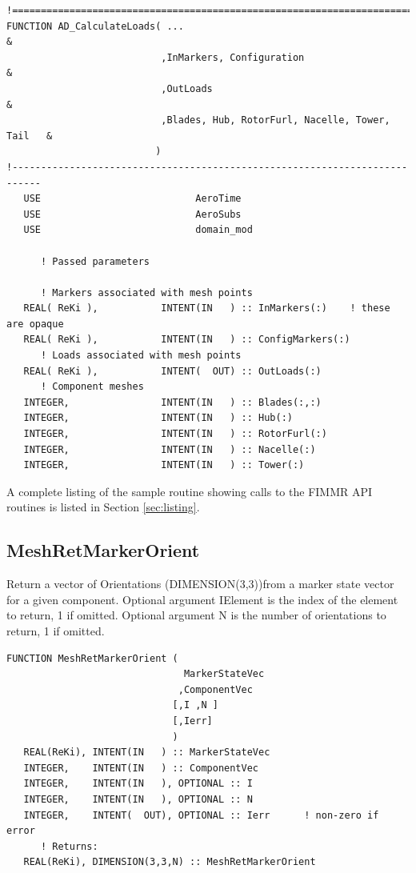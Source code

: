 \documentclass[11pt]{article}
\begin{document}
\begin{verbatim}
!===========================================================================
FUNCTION AD_CalculateLoads( ...                                            &
                           ,InMarkers, Configuration                       &
                           ,OutLoads                                       &
                           ,Blades, Hub, RotorFurl, Nacelle, Tower, Tail   &
                          )
!---------------------------------------------------------------------------
   USE                           AeroTime
   USE                           AeroSubs
   USE                           domain_mod

      ! Passed parameters

      ! Markers associated with mesh points
   REAL( ReKi ),           INTENT(IN   ) :: InMarkers(:)    ! these are opaque
   REAL( ReKi ),           INTENT(IN   ) :: ConfigMarkers(:)
      ! Loads associated with mesh points
   REAL( ReKi ),           INTENT(  OUT) :: OutLoads(:)
      ! Component meshes
   INTEGER,                INTENT(IN   ) :: Blades(:,:)     
   INTEGER,                INTENT(IN   ) :: Hub(:)
   INTEGER,                INTENT(IN   ) :: RotorFurl(:)
   INTEGER,                INTENT(IN   ) :: Nacelle(:)
   INTEGER,                INTENT(IN   ) :: Tower(:)
\end{verbatim}

A complete listing of the sample routine showing calls to the FIMMR API routines is listed
in Section \ref{sec:listing}.


\subsection{MeshRetMarkerOrient}
Return a vector of Orientations (DIMENSION(3,3))from a marker state vector for a given component.
Optional argument IElement is the index of the element to return, 1 if omitted.
Optional argument N is the number of orientations to return, 1 if omitted.
\begin{verbatim}
FUNCTION MeshRetMarkerOrient ( 
                               MarkerStateVec
                              ,ComponentVec 
                             [,I ,N ]
                             [,Ierr]
                             )
   REAL(ReKi), INTENT(IN   ) :: MarkerStateVec
   INTEGER,    INTENT(IN   ) :: ComponentVec
   INTEGER,    INTENT(IN   ), OPTIONAL :: I
   INTEGER,    INTENT(IN   ), OPTIONAL :: N
   INTEGER,    INTENT(  OUT), OPTIONAL :: Ierr 		! non-zero if error
      ! Returns:
   REAL(ReKi), DIMENSION(3,3,N) :: MeshRetMarkerOrient
\end{verbatim}
\end{document}
